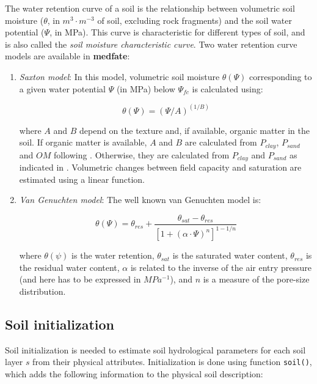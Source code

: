 \documentclass[]{book}
\providecommand{\tightlist}{%
  \setlength{\itemsep}{0pt}\setlength{\parskip}{0pt}}
\begin{document}
The water retention curve of a soil is the relationship between
volumetric soil moisture (\(\theta\), in \(m^3 \cdot m^{-3}\) of soil,
excluding rock fragments) and the soil water potential (\(\Psi\), in
MPa). This curve is characteristic for different types of soil, and is
also called the \emph{soil moisture characteristic curve}. Two water
retention curve models are available in \textbf{medfate}:

\begin{enumerate}
\def\labelenumi{\arabic{enumi}.}
\tightlist
\item
  \emph{Saxton model}: In this model, volumetric soil moisture
  \(\theta(\Psi)\) corresponding to a given water potential \(\Psi\) (in
  MPa) below \(\Psi_{fc}\) is calculated using:

  \begin{equation}\theta(\Psi) = (\Psi/A)^{(1/B)}\end{equation}

  where \(A\) and \(B\) depend on the texture and, if available, organic
  matter in the soil. If organic matter is available, \(A\) and \(B\)
  are calculated from \(P_{clay}\), \(P_{sand}\) and \(OM\) following
  \citet{Saxton2006}. Otherwise, they are calculated from \(P_{clay}\)
  and \(P_{sand}\) as indicated in \citet{Saxton1986}. Volumetric
  changes between field capacity and saturation are estimated using a
  linear function.
\item
  \emph{Van Genuchten model}: The well known van Genuchten
  \citeyearpar{Genuchten1980} model is:

  \begin{equation}\theta(\Psi) = \theta_{res}+\frac{\theta_{sat}-\theta_{res}}{\left[1+ (\alpha \cdot \Psi)^n \right]^{1-1/n}}\end{equation}

  where \(\theta(\psi)\) is the water retention, \(\theta_{sat}\) is the
  saturated water content, \(\theta_{res}\) is the residual water
  content, \(\alpha\) is related to the inverse of the air entry
  pressure (and here has to be expressed in \(MPa^{-1}\)), and \(n\) is
  a measure of the pore-size distribution.
\end{enumerate}

\subsection{Soil initialization}\label{soil-initialization}

Soil initialization is needed to estimate soil hydrological parameters
for each soil layer \(s\) from their physical attributes. Initialization
is done using function \texttt{soil()}, which adds the following
information to the physical soil description:
\end{document}
